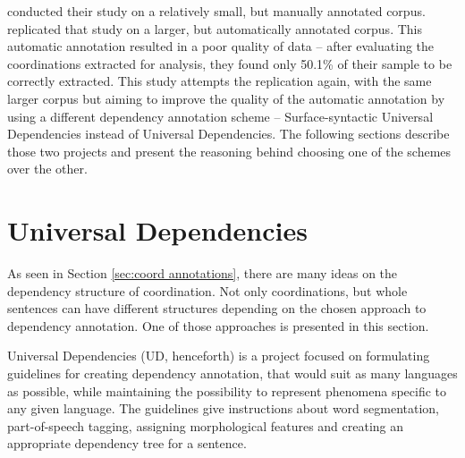 \cite{prz:woz:23} conducted their study on a relatively small, but manually annotated corpus. \cite{prz:etal:24} replicated that study on a larger, but automatically annotated corpus. This automatic annotation resulted in a poor quality of data -- after evaluating the coordinations extracted for analysis, they found only 50.1\% of their sample to be correctly extracted. This study attempts the replication again, with the same larger corpus but aiming to improve the quality of the automatic annotation by using a different dependency annotation scheme -- Surface-syntactic Universal Dependencies instead of Universal Dependencies. The following sections describe those two projects and present the reasoning behind choosing one of the schemes over the other.

\section{Universal Dependencies}\label{sec:ud}

As seen in Section \ref{sec:coord annotations}, there are many ideas on the dependency structure of coordination. Not only coordinations, but whole sentences can have different structures depending on the chosen approach to dependency annotation. One of those approaches is presented in this section.

Universal Dependencies (UD, henceforth) is a project focused on formulating guidelines for creating dependency annotation, that would suit as many languages as possible, while maintaining the possibility to represent phenomena specific to any given language. The guidelines give instructions about word segmentation, part-of-speech tagging, assigning morphological features and creating an appropriate dependency tree for a sentence. 

